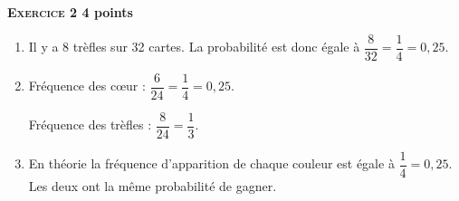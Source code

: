\textbf{\textsc{Exercice 2} \hfill 4 points}

\medskip

% 
%

\begin{enumerate}
\item %
Il y a 8 trèfles sur 32 cartes. La probabilité est donc égale à $\dfrac{8}{32} = \dfrac{1}{4} = 0,25$.
\item %

% 
Fréquence des cœur : $\dfrac{6}{24} = \dfrac{1}{4} = 0,25$.

Fréquence des trèfles : $\dfrac{8}{24} = \dfrac{1}{3}$.
\item %


En théorie la fréquence d’apparition de chaque couleur est égale à $\dfrac{1}{4} = 0,25$. Les deux ont la même probabilité de gagner.
\end{enumerate}
 
\bigskip

